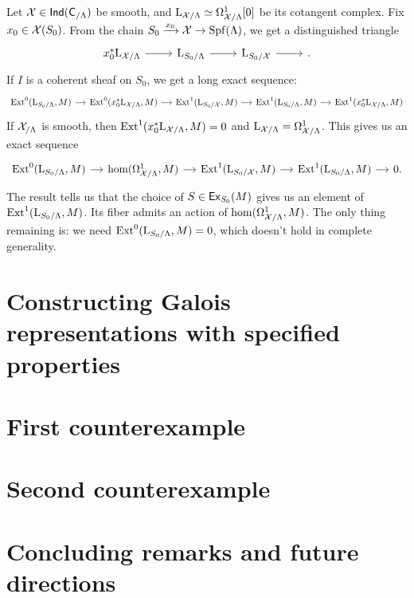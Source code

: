 \documentclass[phd,cornellheadings,draft]{cornell}
\begin{document}
Let $\mathcal{X}\in \operatorname{\mathsf{Ind}}(\mathsf{C}_{/\Lambda})$ be smooth, and 
$\mathrm{L}_{\mathcal{X}/\Lambda}\simeq \Omega_{\mathcal{X}/\Lambda}^1[0]$ be its cotangent complex. 
Fix $x_0\in \mathcal{X}(S_0)$. From the chain 
$S_0\xrightarrow{x_0} \mathcal{X} \to \operatorname{Spf}(\Lambda)$, we get a distinguished triangle 
\cite[II 2.1.5.6]{illusie-1971}
\[
\begin{tikzcd}
	x_0^\ast \LL_{\cX/\Lambda} \ar[r]
		& \LL_{S_0/\Lambda} \ar[r]
		& \LL_{S_0/\cX} \ar[r] 
		& {} .
\end{tikzcd}
\]
If $I$ is a coherent sheaf on $S_0$, we get a long exact sequence:
\[
\begin{tikzcd}[column sep=small]
	\ext^0(\LL_{S_0/\Lambda},M) \ar[r]
		& \ext^0(x_0^\ast \LL_{\cX/\Lambda},M) \ar[r]
		& \ext^1(\LL_{S_0/\cX},M) \ar[r]
		& \ext^1(\LL_{S_0/\Lambda},M) \ar[r]
		& \ext^1(x_0^\ast \LL_{\cX/\Lambda},M)
\end{tikzcd}
\]
If $\mathcal{X}_{/\Lambda}$ is smooth, then $\operatorname{Ext}^1(x_0^\ast\mathrm{L}_{\mathcal{X}/\Lambda},M)=0$ and 
$\mathrm{L}_{\mathcal{X}/\Lambda} = \Omega_{\mathcal{X}/\Lambda}^1$. This gives us an exact sequence 
\[
\begin{tikzcd}[column sep=small]
	\ext^0(\LL_{S_0/\Lambda},M) \ar[r]
		& \hom(\Omega_{\cX/\Lambda}^1,M) \ar[r]
		& \ext^1(\LL_{S_0/\cX},M) \ar[r]
		& \ext^1(\LL_{S_0/\Lambda},M) \ar[r]
		& 0 .
\end{tikzcd}
\]
The result \cite[III 2.1.7]{illusie-1971} tells us that the choice of 
$S\in \mathsf{Ex}_{S_0}(M)$ gives us an element of $\operatorname{Ext}^1(\mathrm{L}_{S_0/\Lambda},M)$. 
Its fiber admits an action of $\hom(\Omega_{\mathcal{X}/\Lambda}^1,M)$. The only thing 
remaining is: we need $\operatorname{Ext}^0(\mathrm{L}_{S_0/\Lambda},M)=0$, which doesn't hold in 
complete generality. 





\chapter{Constructing Galois representations with specified properties}
\chapter{First counterexample}
\chapter{Second counterexample}
\chapter{Concluding remarks and future directions}





\printbibliography
\end{document}
